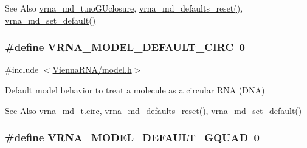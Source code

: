 \begin{DoxySeeAlso}{See Also}
\hyperlink{group__model__details_a7e883db1f33f8f3baa5c9b140350c78e}{vrna\-\_\-md\-\_\-t.\-no\-G\-Uclosure}, \hyperlink{group__model__details_ga70834424cf804d149937de89f80ceb45}{vrna\-\_\-md\-\_\-defaults\-\_\-reset()}, \hyperlink{group__model__details_ga8ac6ff84936282436f822644bf841f66}{vrna\-\_\-md\-\_\-set\-\_\-default()} 
\end{DoxySeeAlso}
\hypertarget{group__model__details_ga22059033db7bcd875c51fec32425490a}{
\subsubsection[{V\-R\-N\-A\-\_\-\-M\-O\-D\-E\-L\-\_\-\-D\-E\-F\-A\-U\-L\-T\-\_\-\-C\-I\-R\-C}]{\setlength{\rightskip}{0pt plus 5cm}\#define V\-R\-N\-A\-\_\-\-M\-O\-D\-E\-L\-\_\-\-D\-E\-F\-A\-U\-L\-T\-\_\-\-C\-I\-R\-C~0}}\label{group__model__details_ga22059033db7bcd875c51fec32425490a}


{\ttfamily \#include $<$\hyperlink{model_8h}{Vienna\-R\-N\-A/model.\-h}$>$}



Default model behavior to treat a molecule as a circular R\-N\-A (D\-N\-A) 

\begin{DoxySeeAlso}{See Also}
\hyperlink{group__model__details_a92762e1008503d4623ff5c01e358a464}{vrna\-\_\-md\-\_\-t.\-circ}, \hyperlink{group__model__details_ga70834424cf804d149937de89f80ceb45}{vrna\-\_\-md\-\_\-defaults\-\_\-reset()}, \hyperlink{group__model__details_ga8ac6ff84936282436f822644bf841f66}{vrna\-\_\-md\-\_\-set\-\_\-default()} 
\end{DoxySeeAlso}
\hypertarget{group__model__details_ga793ed812e86f43799b14b2deee917f23}{
\subsubsection[{V\-R\-N\-A\-\_\-\-M\-O\-D\-E\-L\-\_\-\-D\-E\-F\-A\-U\-L\-T\-\_\-\-G\-Q\-U\-A\-D}]{\setlength{\rightskip}{0pt plus 5cm}\#define V\-R\-N\-A\-\_\-\-M\-O\-D\-E\-L\-\_\-\-D\-E\-F\-A\-U\-L\-T\-\_\-\-G\-Q\-U\-A\-D~0}}\label{group__model__details_ga793ed812e86f43799b14b2deee917f23}


